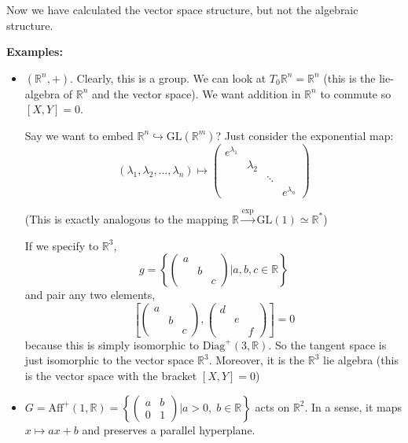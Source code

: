\documentclass[12pt]{article}
\newcommand{\R}{\mathbb{R}}
\newcommand{\GL}{\text{GL}}
\begin{document}
    Now we have calculated the vector space structure, but not the algebraic structure. 

    \textbf{Examples:} 
    \begin{itemize}
        \item $(\R^n, +)$. Clearly, this is a group. We can look at $T_0\R^n = \R^n$ (this is the lie-algebra of $\R^n$ and the vector space). We want addition in $\R^n$ to commute so $[X, Y] = 0$. 
        
        Say we want to embed $\R^n \hookrightarrow \GL(\R^m)$? Just consider the exponential map:
        \[(\lambda_1, \lambda_2, \dots, \lambda_n) \mapsto \begin{pmatrix}
            e^{\lambda_1}\\ 
            & \lambda_2\\ 
            & & \ddots\\
            & & & e^{\lambda_n}
        \end{pmatrix}\]

        (This is exactly analogous to the mapping $\R \overset{\exp}{\to} \GL(1) \simeq \R^*$)

        If we specify to $\R^3$, 
        \[g =\left\{\begin{pmatrix}
                a\\ 
                & b\\ 
                & & c
            \end{pmatrix} \bigg\vert a, b, c \in \R \right\}\]
        and pair any two elements, 
        \[\left[\begin{pmatrix}
            a\\ 
            & b\\ 
            & & c
        \end{pmatrix}, \begin{pmatrix}
            d\\ 
            & e\\ 
            & & f
        \end{pmatrix}\right] = 0\]
        because this is simply isomorphic to $\text{Diag}^+(3, \R)$. So the tangent space is just isomorphic to the vector space $\R^3$. Moreover, it is the $\R^3$ lie algebra (this is the vector space with the bracket $[X, Y] = 0$)

        \item $G = \text{Aff}^+(1, \R) = \left\{\begin{pmatrix}
            a & b\\ 
            0 & 1
        \end{pmatrix} \bigg\vert a > 0,\; b \in \R\right\}$ acts on $\R^2$. In a sense, it maps $x \mapsto ax + b$ and preserves a parallel hyperplane. 


\end{itemize}
\end{document}
